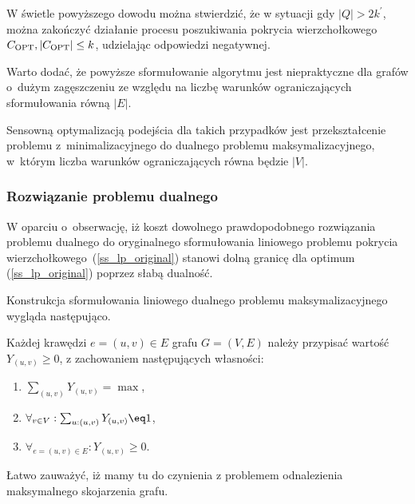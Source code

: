 W świetle powyższego dowodu można stwierdzić, że w sytuacji gdy
$|Q|>2k^\prime$, można zakończyć działanie procesu poszukiwania pokrycia
wierzchołkowego $C_{\textnormal{OPT}}, |C_{\textnormal{OPT}}|\leq k$, udzielając odpowiedzi negatywnej.

Warto dodać, że powyższe sformułowanie algorytmu jest niepraktyczne dla
grafów o~dużym zagęszczeniu ze względu na liczbę warunków ograniczających 
sformułowania równą $|E|$.

Sensowną optymalizacją podejścia dla takich przypadków jest przekształcenie
problemu z~minimalizacyjnego do dualnego problemu maksymalizacyjnego, 
w~którym liczba warunków ograniczających równa będzie $|V|$.

\subsubsection{\textbf{Rozwiązanie problemu dualnego}}

W oparciu o~obserwację, iż koszt dowolnego prawdopodobnego rozwiązania problemu
dualnego do oryginalnego sformułowania liniowego problemu pokrycia
wierzchołkowego~(\ref{ss_lp_original}) stanowi dolną granicę dla optimum
(\ref{ss_lp_original}) poprzez słabą dualność. 

Konstrukcja sformułowania liniowego dualnego problemu maksymalizacyjnego wygląda
następująco.

Każdej krawędzi $e=(u,v) \in E$ grafu $G=(V,E)$ należy przypisać wartość
$Y_(u,v) \geq 0$, z zachowaniem następujących własności:
\begin{enumerate}
  \item $\sum_{(u,v)}Y_{(u,v)} = \max$,
  \item $\forall_{v \in V}:\sum_{u:(u,v)}Y_{(u,v)}\eq 1$,
  \item $\forall_{e=(u,v) \in E}: Y_{(u,v)} \geq 0$.
\end{enumerate}

Łatwo zauważyć, iż mamy tu do czynienia z problemem odnalezienia maksymalnego
skojarzenia grafu.
